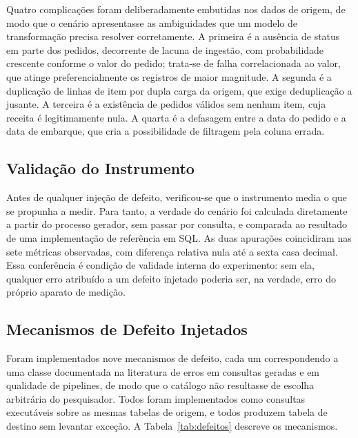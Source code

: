 \documentclass[11pt,a4paper]{article}
\begin{document}
Quatro complicações foram deliberadamente embutidas nos dados de origem,
de modo que o cenário apresentasse as ambiguidades que um modelo de
transformação precisa resolver corretamente. A primeira é a ausência de
status em parte dos pedidos, decorrente de lacuna de ingestão, com
probabilidade crescente conforme o valor do pedido; trata-se de falha
correlacionada ao valor, que atinge preferencialmente os registros de
maior magnitude. A segunda é a duplicação de linhas de item por dupla
carga da origem, que exige deduplicação a jusante. A terceira é a
existência de pedidos válidos sem nenhum item, cuja receita é
legitimamente nula. A quarta é a defasagem entre a data do pedido e a data
de embarque, que cria a possibilidade de filtragem pela coluna errada.

\subsection{Validação do Instrumento}

Antes de qualquer injeção de defeito, verificou-se que o instrumento media
o que se propunha a medir. Para tanto, a verdade do cenário foi calculada
diretamente a partir do processo gerador, sem passar por consulta, e
comparada ao resultado de uma implementação de referência em SQL. As duas
apurações coincidiram nas sete métricas observadas, com diferença relativa
nula até a sexta casa decimal. Essa conferência é condição de validade
interna do experimento: sem ela, qualquer erro atribuído a um defeito
injetado poderia ser, na verdade, erro do próprio aparato de medição.

\subsection{Mecanismos de Defeito Injetados}

Foram implementados nove mecanismos de defeito, cada um correspondendo a
uma classe documentada na literatura de erros em consultas geradas e em
qualidade de pipelines, de modo que o catálogo não resultasse de escolha
arbitrária do pesquisador. Todos foram implementados como consultas
executáveis sobre as mesmas tabelas de origem, e todos produzem tabela de
destino sem levantar exceção. A Tabela~\ref{tab:defeitos} descreve os
mecanismos.
\end{document}
